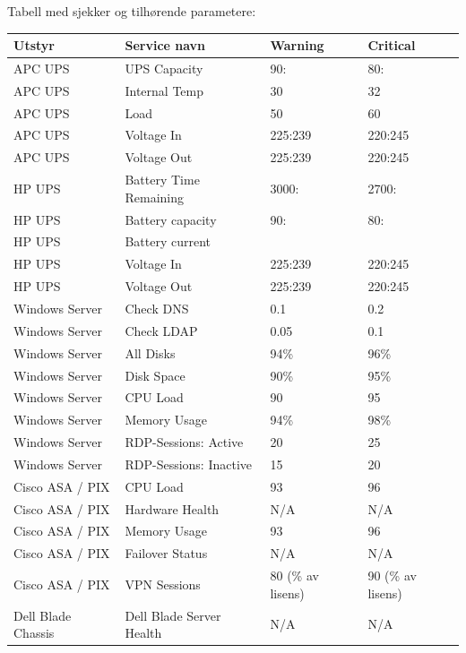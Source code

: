 Tabell med sjekker og tilhørende parametere:
\begin{table}
\begin{center}
\begin{tabular}{| l | l | l | l |}
 \hline
        \textbf{Utstyr} & \textbf{Service navn} & \textbf{Warning} & \textbf{Critical}
	\\ \hline
	APC UPS 		& UPS Capacity			& 90:	& 80: \\ \hline
	APC UPS			& Internal Temp			& 30	& 32 \\ \hline
	APC UPS			& Load				& 50	& 60 \\ \hline
	APC UPS			& Voltage In			& 225:239 & 220:245 \\ \hline
	APC UPS			& Voltage Out			& 225:239 & 220:245 \\ \hline 
	HP UPS			& Battery Time Remaining 	& 3000: & 2700: \\ \hline
	HP UPS			& Battery capacity		& 90: 	& 80: \\ \hline
	HP UPS			& Battery current		& 	& \\ \hline
	HP UPS			& Voltage In			& 225:239 & 220:245 \\ \hline 
	HP UPS			& Voltage Out			& 225:239 & 220:245 \\ \hline
	Windows Server		& Check DNS			& 0.1	& 0.2 \\ \hline
	Windows Server		& Check LDAP			& 0.05	& 0.1 \\ \hline 
	Windows Server		& All Disks			& 94\%	& 96\% \\ \hline
	Windows Server		& Disk Space			& 90\%	& 95\% \\ \hline
	Windows Server		& CPU Load			& 90	& 95 \\ \hline
	Windows Server		& Memory Usage			& 94\%	& 98\% \\ \hline
	Windows Server		& RDP-Sessions: Active		& 20	& 25 \\ \hline
	Windows Server		& RDP-Sessions: Inactive	& 15	& 20 \\ \hline
	Cisco ASA / PIX		& CPU Load			& 93	& 96 \\ \hline
	Cisco ASA / PIX		& Hardware Health		& N/A	& N/A \\ \hline
	Cisco ASA / PIX		& Memory Usage			& 93	& 96 \\ \hline
	Cisco ASA / PIX		& Failover Status		& N/A	& N/A \\ \hline
	Cisco ASA / PIX		& VPN Sessions			& 80 (\% av lisens) & 90 (\% av lisens) \\ \hline
	Dell Blade Chassis	& Dell Blade Server Health	& N/A	& N/A \\ \hline

\end{tabular}
\end{center}
\end{table}
